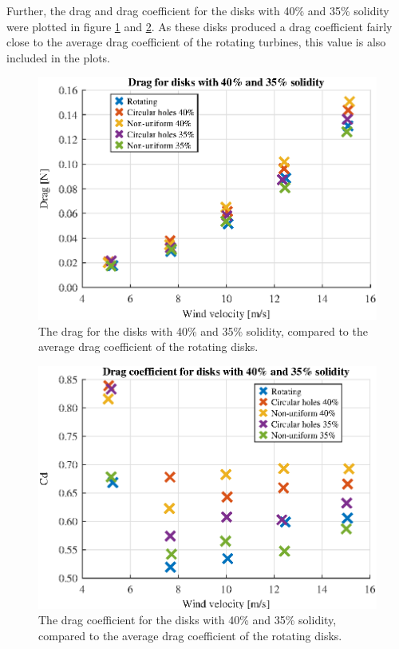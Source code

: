 Further, the drag and drag coefficient for the disks with 40\% and 35\% solidity were plotted in figure \ref{fig:FortyDrag} and \ref{fig:FortyCD}. As these disks produced a drag coefficient fairly close to the average drag coefficient of the rotating turbines, this value is also included in the plots. 

\begin{figure}[h!]
    \centering
    \includegraphics[width=\linewidth]{0_Images/FortyDrag.eps}
    \caption{The drag for the disks with 40\% and 35\% solidity, compared to the average drag coefficient of the rotating disks.}
    \label{fig:FortyDrag}
\end{figure}

\begin{figure}[h!]
    \centering
    \includegraphics[width=\linewidth]{0_Images/FortyCD.eps}
    \caption{The drag coefficient for the disks with 40\% and 35\% solidity, compared to the average drag coefficient of the rotating disks.}
    \label{fig:FortyCD}
\end{figure}

